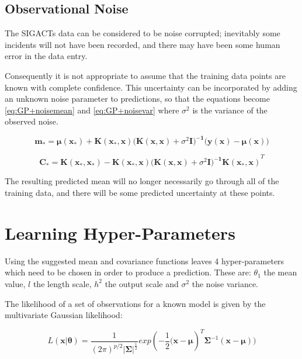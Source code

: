 \documentclass[a4paper,11pt]{report}
\begin{document}
\subsection{Observational Noise}

The SIGACTs data can be considered to be noise corrupted; inevitably some incidents will not have been recorded, and there may have been some human error in the data entry. 

Consequently it is not appropriate to assume that the training data points are known with complete confidence. This uncertainty can be incorporated by adding an unknown noise parameter to predictions, so that the equations become \ref{eq:GP+noisemean} and \ref{eq:GP+noisevar} where \( \sigma^2 \) is the variance of the observed noise.

\singlespacing


\begin{equation} \label{eq:GP+noisemean}
\mathbf{m_*} = \boldsymbol{\mu} \mathbf{(x_*) + K(x_* ,x) (K(x,x)}+\sigma^2 \mathbf{I)^{-1} (y(x)} - \boldsymbol{\mu} \mathbf{(x))}
\end{equation}

\begin{equation} \label{eq:GP+noisevar}
\mathbf{ C_* = K(x_*,x_*)-K(x_*,x) (K(x,x)}+\sigma^2 \mathbf{I)^{-1} K(x_*,x)}^{T}
\end{equation}

\doublespacing

The resulting predicted mean will no longer necessarily go through all of the training data, and there will be some predicted uncertainty at these points.

\section{Learning Hyper-Parameters}
Using the suggested mean and covariance functions leaves 4 hyper-parameters which need to be chosen in order to produce a prediction. These are: \(\theta_1\) the mean value, \(l\) the length scale, \(h^2\) the output scale and \(\sigma^2\) the noise variance. 

The likelihood of a set of observations for a known model is given by the multivariate Gaussian likelihood:

\begin{equation} \label{eq:GPlikelihood}
L(\mathbf{x | \boldsymbol{\theta}}) = \frac{1}{(2\pi)^{p/2} |\boldsymbol{\Sigma|}^{\frac{1}{2}}} exp(- \frac{1}{2} \mathbf{(x}-\boldsymbol{\mu})^{T}\boldsymbol{\Sigma}^{-1}(\mathbf{x}-\boldsymbol{\mu}))
\end{equation}
\end{document}
